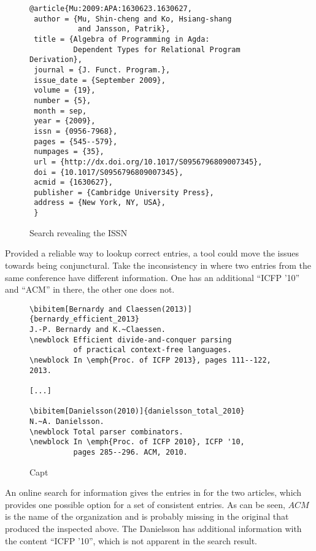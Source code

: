 \begin{figure}
  \centering
\begin{verbatim}
@article{Mu:2009:APA:1630623.1630627,
 author = {Mu, Shin-cheng and Ko, Hsiang-shang
           and Jansson, Patrik},
 title = {Algebra of Programming in Agda:
          Dependent Types for Relational Program Derivation},
 journal = {J. Funct. Program.},
 issue_date = {September 2009},
 volume = {19},
 number = {5},
 month = sep,
 year = {2009},
 issn = {0956-7968},
 pages = {545--579},
 numpages = {35},
 url = {http://dx.doi.org/10.1017/S0956796809007345},
 doi = {10.1017/S0956796809007345},
 acmid = {1630627},
 publisher = {Cambridge University Press},
 address = {New York, NY, USA},
 }
\end{verbatim}
  \caption{Search revealing the ISSN}
\label{fig:entry_issn_found}
\end{figure}


Provided a reliable way to lookup correct entries, a tool could move
the issues towards being conjunctural.  Take the inconsistency in
 where two entries from the same
conference have different information.  One has an additional ``ICFP
'10'' and ``ACM'' in there, the other one does not.

\begin{figure}
  \centering
  \begin{small}
\begin{verbatim}
\bibitem[Bernardy and Claessen(2013)]{bernardy_efficient_2013}
J.-P. Bernardy and K.~Claessen.
\newblock Efficient divide-and-conquer parsing
          of practical context-free languages.
\newblock In \emph{Proc. of ICFP 2013}, pages 111--122, 2013.

[...]

\bibitem[Danielsson(2010)]{danielsson_total_2010}
N.~A. Danielsson.
\newblock Total parser combinators.
\newblock In \emph{Proc. of ICFP 2010}, ICFP '10,
          pages 285--296. ACM, 2010.
\end{verbatim}
  \end{small}
  \caption{Capt}
\label{fig:inconsistent_proceedings}
\end{figure}

An online search for {\bibtex} information gives the entries in
 for the two articles, which
provides one possible option for a set of consistent entries.  As can
be seen, $ACM$ is the name of the organization and is probably missing
in the original {\bibtex} that produced the  inspected
above.  The Danielsson has additional information with the content
``ICFP '10'', which is not apparent in the search result.

